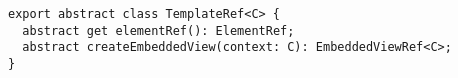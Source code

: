 \begin{verbatim}
export abstract class TemplateRef<C> {
  abstract get elementRef(): ElementRef;
  abstract createEmbeddedView(context: C): EmbeddedViewRef<C>;
}
\end{verbatim}

